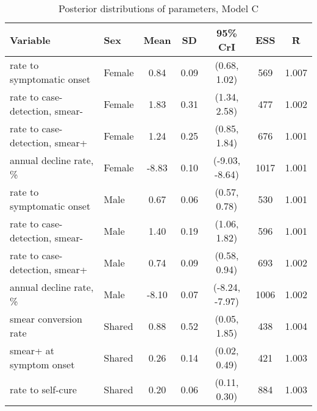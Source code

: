 \begin{table}[h]

\caption{\label{tab:}Posterior distributions of parameters, Model C}
\centering
\begin{tabular}[t]{llccccc}
\toprule
Variable & Sex & Mean & SD & 95\% CrI & ESS & \^{R}\\
\midrule
rate to symptomatic onset & Female & 0.84 & 0.09 & (0.68, 1.02) & 569 & 1.007\\
rate to case-detection, smear- & Female & 1.83 & 0.31 & (1.34, 2.58) & 477 & 1.002\\
rate to case-detection, smear+ & Female & 1.24 & 0.25 & (0.85, 1.84) & 676 & 1.001\\
annual decline rate, \% & Female & -8.83 & 0.10 & (-9.03, -8.64) & 1017 & 1.001\\
\addlinespace
rate to symptomatic onset & Male & 0.67 & 0.06 & (0.57, 0.78) & 530 & 1.001\\
rate to case-detection, smear- & Male & 1.40 & 0.19 & (1.06, 1.82) & 596 & 1.001\\
rate to case-detection, smear+ & Male & 0.74 & 0.09 & (0.58, 0.94) & 693 & 1.002\\
annual decline rate, \% & Male & -8.10 & 0.07 & (-8.24, -7.97) & 1006 & 1.002\\
\addlinespace
smear conversion rate & Shared & 0.88 & 0.52 & (0.05, 1.85) & 438 & 1.004\\
smear+ at symptom onset & Shared & 0.26 & 0.14 & (0.02, 0.49) & 421 & 1.003\\
rate to self-cure & Shared & 0.20 & 0.06 & (0.11, 0.30) & 884 & 1.003\\
\bottomrule
\end{tabular}
\end{table}

